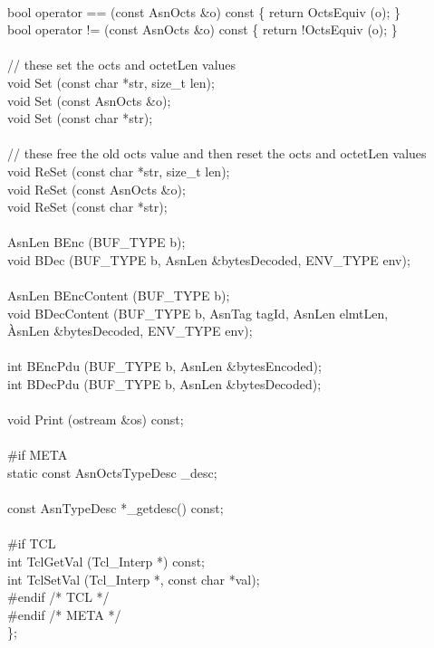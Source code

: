 \begin{Ccode}
\\
  bool				\>\>operator == (const AsnOcts \&o) const \{ return OctsEquiv (o); \}\\
  bool				\>\>operator != (const AsnOcts \&o) const \{ return !OctsEquiv (o); \}\\
\\
  // these set the octs and octetLen values\\
  void				\>\>Set (const char *str, size\_t len);\\
  void				\>\>Set (const AsnOcts \&o);\\
  void				\>\>Set (const char *str);\\
\\
  // these free the old octs value and then reset the octs and octetLen values\\
  void				\>\>ReSet (const char *str, size\_t len);\\
  void				\>\>ReSet (const AsnOcts \&o);\\
  void				\>\>ReSet (const char *str);\\
\\
  AsnLen			\>\>BEnc (BUF\_TYPE b);\\
  void				\>\>BDec (BUF\_TYPE b, AsnLen \&bytesDecoded, ENV\_TYPE env);\\
\\
  AsnLen			\>\>BEncContent (BUF\_TYPE b);\\
  void				\>\>BDecContent (BUF\_TYPE b, AsnTag tagId, AsnLen elmtLen,\\
					\`AsnLen \&bytesDecoded, ENV\_TYPE env);\\
\\
  int				\>\>BEncPdu (BUF\_TYPE b, AsnLen \&bytesEncoded);\\
  int				\>\>BDecPdu (BUF\_TYPE b, AsnLen \&bytesDecoded);\\
\\
  void				\>\>Print (ostream \&os) const;\\
\\
\<\#if META\\
  static const AsnOctsTypeDesc	\>\>\_desc;\\
\\
  const AsnTypeDesc		\>\>*\_getdesc() const;\\
\\
\<\#if TCL\\
  int				\>\>TclGetVal (Tcl\_Interp *) const;\\
  int				\>\>TclSetVal (Tcl\_Interp *, const char *val);\-\\
\#endif /* TCL */\\
\#endif /* META */\\
\};
\end{Ccode}

